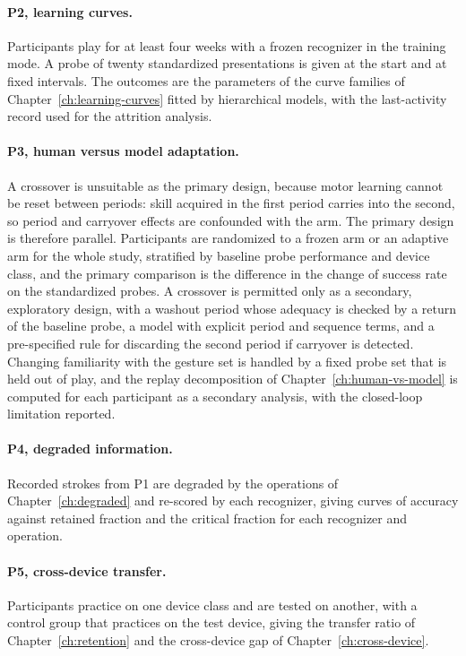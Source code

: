\paragraph{P2, learning curves.} Participants play for at least four weeks with a frozen recognizer in the training mode. A probe of twenty standardized presentations is given at the start and at fixed intervals. The outcomes are the parameters of the curve families of Chapter~\ref{ch:learning-curves} fitted by hierarchical models, with the last-activity record used for the attrition analysis.

\paragraph{P3, human versus model adaptation.} A crossover is unsuitable as the primary design, because motor learning cannot be reset between periods: skill acquired in the first period carries into the second, so period and carryover effects are confounded with the arm. The primary design is therefore parallel. Participants are randomized to a frozen arm or an adaptive arm for the whole study, stratified by baseline probe performance and device class, and the primary comparison is the difference in the change of success rate on the standardized probes. A crossover is permitted only as a secondary, exploratory design, with a washout period whose adequacy is checked by a return of the baseline probe, a model with explicit period and sequence terms, and a pre-specified rule for discarding the second period if carryover is detected. Changing familiarity with the gesture set is handled by a fixed probe set that is held out of play, and the replay decomposition of Chapter~\ref{ch:human-vs-model} is computed for each participant as a secondary analysis, with the closed-loop limitation reported.

\paragraph{P4, degraded information.} Recorded strokes from P1 are degraded by the operations of Chapter~\ref{ch:degraded} and re-scored by each recognizer, giving curves of accuracy against retained fraction and the critical fraction for each recognizer and operation.

\paragraph{P5, cross-device transfer.} Participants practice on one device class and are tested on another, with a control group that practices on the test device, giving the transfer ratio of Chapter~\ref{ch:retention} and the cross-device gap of Chapter~\ref{ch:cross-device}.

